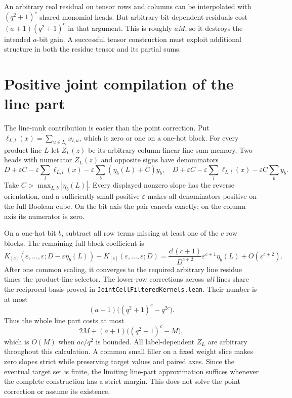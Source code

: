 \documentclass[11pt]{article}
\begin{document}
An arbitrary real residual on tensor rows and columns can be interpolated
with $(q^2+1)^c$ shared monomial heads. But arbitrary bit-dependent residuals
cost $(a+1)(q^2+1)^c$ in that argument. This is roughly $aM$, so it destroys
the intended $a$-bit gain. A successful tensor construction must exploit
additional structure in both the residue tensor and its partial sums.

\section{Positive joint compilation of the line part}

The line-rank contribution is easier than the point correction. Put
$\ell_{L,l}(x)=\sum_{u\in L_l}x_{l,u}$, which is zero or one on a one-hot
block. For every product line $L$ let $Z_L(z)$ be its arbitrary column-linear
line-sum memory. Two heads with numerator $Z_L(z)$ and opposite signs have
denominators
\[
 D+\varepsilon C-\varepsilon\sum_l\ell_{L,l}(x)
 -\varepsilon\sum_b(\eta_b(L)+C)y_b,
 \quad
 D+\varepsilon C-\varepsilon\sum_l\ell_{L,l}(x)
 -\varepsilon C\sum_b y_b.
\]
Take $C>\max_{L,b}|\eta_b(L)|$. Every displayed nonzero slope has the
reverse orientation, and a sufficiently small positive $\varepsilon$
makes all denominators positive on the full Boolean cube. On the bit axis
the pair cancels exactly; on the column axis its numerator is zero.

On a one-hot bit $b$, subtract all row terms missing at least one of the
$c$ row blocks. The remaining full-block coefficient is
\[
 K_{[c]}(\varepsilon,\ldots,\varepsilon;D-\varepsilon\eta_b(L))
 -K_{[c]}(\varepsilon,\ldots,\varepsilon;D)
 =\frac{c!(c+1)}{D^{c+2}}\varepsilon^{c+1}\eta_b(L)
  +O(\varepsilon^{c+2}).
\]
After one common scaling, it converges to the required arbitrary line
residue times the product-line selector. The lower-row corrections across
\emph{all} lines share the reciprocal basis proved in
\texttt{JointCellFilteredKernels.lean}. Their number is at most
\[
 (a+1)\bigl((q^2+1)^c-q^{2c}\bigr).
\]
Thus the whole line part costs at most
\[
 2M+(a+1)\bigl((q^2+1)^c-M\bigr),
\]
which is $O(M)$ when $ac/q^2$ is bounded. All label-dependent $Z_L$ are
arbitrary throughout this calculation. A common small filler on a fixed
weight slice makes zero slopes strict while preserving target values and
paired axes. Since the eventual target set is finite, the limiting
line-part approximation suffices whenever the complete construction has a
strict margin. This does not solve the point correction or assume its
existence.
\end{document}
